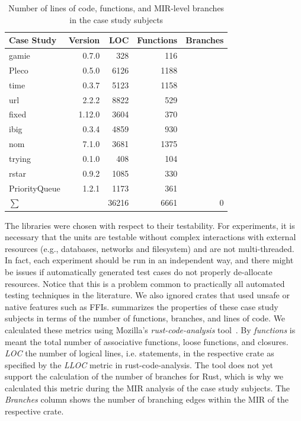 \documentclass[paper=a4,%
  twoside,%
  BCOR4mm,%
  abstract=true,%
  toc=bibliography,%
  chapterprefix=true,%
  toc=bibliographynumbered,%
  open=right,%
  english,%
  pagesize=pdftex]{scrreprt}
\newcommand{\loc}{36216\xspace}
\newcommand{\methodsnum}{6661\xspace}
\newcommand{\branches}{0\xspace}
\newcommand{\mir}{\ac{MIR}\xspace}
\begin{document}
\begin{table}[]
\begin{tabular*}{\textwidth}{l @{\extracolsep{\fill}} rrrr}
\hline
\textbf{Case Study} & \textbf{Version} & \textbf{LOC} & \textbf{Functions} & \textbf{Branches} \\
\hline
gamie & 0.7.0 & 328 & 116 &  \\
Pleco & 0.5.0 & 6126 & 1188 &  \\
time & 0.3.7 & 5123 & 1158 &  \\
url & 2.2.2 & 8822 & 529 &  \\
fixed & 1.12.0 & 3604 & 370 &  \\
ibig & 0.3.4 & 4859 & 930 &  \\
nom & 7.1.0 & 3681 & 1375 &  \\
trying & 0.1.0 & 408 & 104 &  \\
rstar & 0.9.2 & 1085 & 330 &  \\
PriorityQueue & 1.2.1 & 1173 & 361 &  \\
\hline
$\sum$ &  & \loc & \methodsnum & \branches \\
\hline
\end{tabular*}
\caption{\label{tab:properties-of-case-study-subjects}Number of lines of code, functions, and \mir-level branches in the case study subjects}
\end{table}
The libraries were chosen with respect to their testability. For experiments, it is necessary that the units are testable without complex interactions with external resources (e.g., databases, networks and filesystem) and are not multi-threaded. In fact, each experiment should be run in an independent way, and there might be issues if automatically generated test cases do not properly de-allocate resources. Notice that this is a problem common to practically all automated testing techniques in the literature. We also ignored crates that used unsafe or native features such as FFIs.  summarizes the properties of these case study subjects in terms of the number of functions, branches, and lines of code. We calculated these metrics using Mozilla's \emph{rust-code-analysis} tool~\cite{Ardito2020}. By \emph{functions} is meant the total number of associative functions, loose functions, and closures. \emph{LOC} the number of logical lines, i.e. statements, in the respective crate as specified by the \emph{LLOC} metric in rust-code-analysis. The tool does not yet support the calculation of the number of branches for Rust, which is why we calculated this metric during the \mir analysis of the case study subjects. The \emph{Branches} column shows the number of branching edges within the \mir of the respective crate. 
\end{document}
